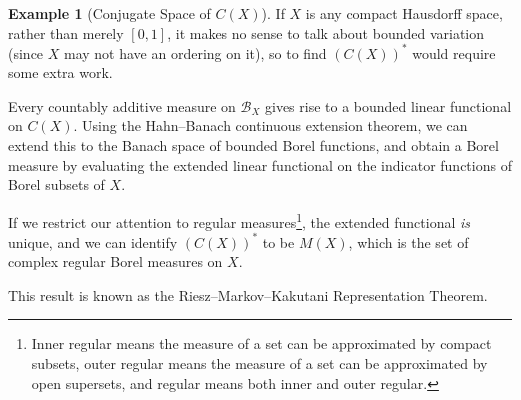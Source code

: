 \documentclass[12pt]{extarticle}
\theoremstyle{plain}
\theoremstyle{definition}
\newtheorem*{example}{Example}
\theoremstyle{note}
\renewcommand{\newline}{\hfill\break}
\begin{document}
\begin{example}[Conjugate Space of $C(X)$]
  If $X$ is any compact Hausdorff space, rather than merely $[0,1]$, it makes no sense to talk about bounded variation (since $X$ may not have an ordering on it), so to find $\left(C(X)\right)^{\ast}$ would require some extra work.\newline

  Every countably additive measure on $\mathcal{B}_{X}$ gives rise to a bounded linear functional on $C(X)$. Using the Hahn--Banach continuous extension theorem, we can extend this to the Banach space of bounded Borel functions, and obtain a Borel measure by evaluating the extended linear functional on the indicator functions of Borel subsets of $X$.\newline

  If we restrict our attention to regular measures\footnote{Inner regular means the measure of a set can be approximated by compact subsets, outer regular means the measure of a set can be approximated by open supersets, and regular means both inner and outer regular.}, the extended functional \textit{is} unique, and we can identify $\left(C(X)\right)^{\ast}$ to be $M(X)$, which is the set of complex regular Borel measures on $X$.\newline

  This result is known as the Riesz--Markov--Kakutani Representation Theorem.
\end{example}
\end{document}
